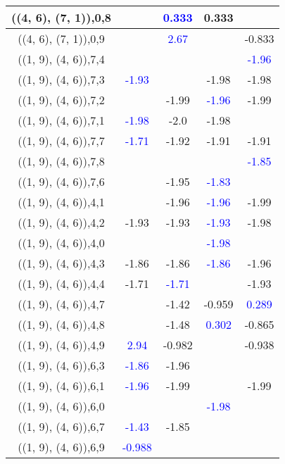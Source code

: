 \documentclass{article}
\begin{document}
\begin{center}
\begin{longtable}{|c|c|c|c|c|}
        	((4, 6), (7, 1)),0,8&& \textcolor{blue}{0.333}&0.333&\\
        	\hline
        	((4, 6), (7, 1)),0,9&& \textcolor{blue}{2.67}&&-0.833\\
        	\hline
        	((1, 9), (4, 6)),7,4&&&& \textcolor{blue}{-1.96}\\
        	\hline
        	((1, 9), (4, 6)),7,3& \textcolor{blue}{-1.93}&&-1.98&-1.98\\
        	\hline
        	((1, 9), (4, 6)),7,2&&-1.99& \textcolor{blue}{-1.96}&-1.99\\
        	\hline
        	((1, 9), (4, 6)),7,1& \textcolor{blue}{-1.98}&-2.0&-1.98&\\
        	\hline
        	((1, 9), (4, 6)),7,7& \textcolor{blue}{-1.71}&-1.92&-1.91&-1.91\\
        	\hline
        	((1, 9), (4, 6)),7,8&&&& \textcolor{blue}{-1.85}\\
        	\hline
        	((1, 9), (4, 6)),7,6&&-1.95& \textcolor{blue}{-1.83}&\\
        	\hline
        	((1, 9), (4, 6)),4,1&&-1.96& \textcolor{blue}{-1.96}&-1.99\\
        	\hline
        	((1, 9), (4, 6)),4,2&-1.93&-1.93& \textcolor{blue}{-1.93}&-1.98\\
        	\hline
        	((1, 9), (4, 6)),4,0&&& \textcolor{blue}{-1.98}&\\
        	\hline
        	((1, 9), (4, 6)),4,3&-1.86&-1.86& \textcolor{blue}{-1.86}&-1.96\\
        	\hline
        	((1, 9), (4, 6)),4,4&-1.71& \textcolor{blue}{-1.71}&&-1.93\\
        	\hline
        	((1, 9), (4, 6)),4,7&&-1.42&-0.959& \textcolor{blue}{0.289}\\
        	\hline
        	((1, 9), (4, 6)),4,8&&-1.48& \textcolor{blue}{0.302}&-0.865\\
        	\hline
        	((1, 9), (4, 6)),4,9& \textcolor{blue}{2.94}&-0.982&&-0.938\\
        	\hline
        	((1, 9), (4, 6)),6,3& \textcolor{blue}{-1.86}&-1.96&&\\
        	\hline
        	((1, 9), (4, 6)),6,1& \textcolor{blue}{-1.96}&-1.99&&-1.99\\
        	\hline
        	((1, 9), (4, 6)),6,0&&& \textcolor{blue}{-1.98}&\\
        	\hline
        	((1, 9), (4, 6)),6,7& \textcolor{blue}{-1.43}&-1.85&&\\
        	\hline
        	((1, 9), (4, 6)),6,9& \textcolor{blue}{-0.988}&&&\\

\end{longtable}
\end{center}
\end{document}
